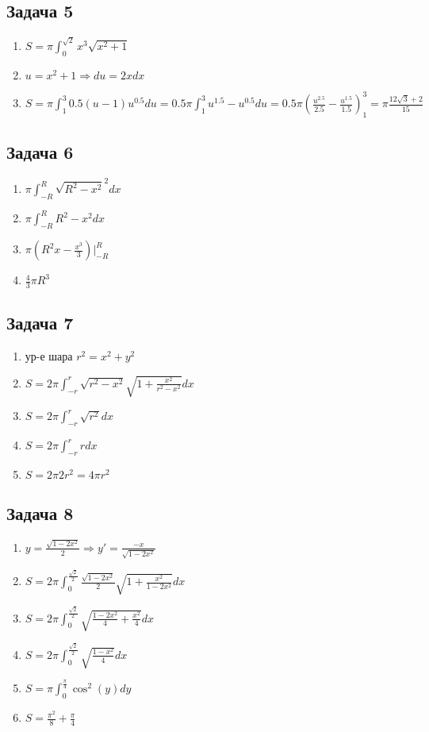 \documentclass[a4paper,12pt]{article}
\begin{document}
\subsection{Задача 5}
\begin{enumerate}
    \item $S = \pi \int_{0}^{\sqrt{2}} x^3\sqrt{x^2+1}$
    \item $u = x^2+1 \Rightarrow du = 2x dx$
    \item $S = \pi \int_{1}^{3} 0.5(u-1)u^{0.5}du = 0.5\pi \int_{1}^{3} u^{1.5}-u^{0.5} du = 0.5\pi (\frac{u^{2.5}}{2.5}-\frac{u^{1.5}}{1.5})_{1}^{3} = \pi \frac{12\sqrt{3}+2}{15}$
\end{enumerate}

\subsection{Задача 6}
\begin{enumerate}
    \item $\pi \int_{-R}^{R} \sqrt{R^2-x^2}^2dx$
    \item $\pi \int_{-R}^{R} R^2-x^2dx$
    \item $\pi (R^2x-\frac{x^3}{3})|_{-R}^R$
    \item $\frac{4}{3}\pi R^3$
\end{enumerate}

\subsection{Задача 7}
\begin{enumerate}
    \item ур-е шара $r^2=x^2+y^2$
    \item $S = 2\pi \int_{-r}^{r}\sqrt{r^2-x^2}\sqrt{1+\frac{x^2}{r^2-x^2}}dx$
    \item $S = 2\pi \int_{-r}^{r} \sqrt{r^2}dx$
    \item $S = 2\pi \int_{-r}^{r} rdx$
    \item $S = 2\pi 2r^2=4\pi r^2$
\end{enumerate}

\subsection{Задача 8}
\begin{enumerate}
    \item $y=\frac{\sqrt{1-2x^2}}{2} \Rightarrow y'=\frac{-x}{\sqrt{1-2x^2}}$
    \item $S = 2\pi \int_{0}^{\frac{\sqrt{2}}{2}}\frac{\sqrt{1-2x^2}}{2} \sqrt{1+\frac{x^2}{1-2x^2}}dx$
    \item $S = 2\pi \int_{0}^{\frac{\sqrt{2}}{2}}\sqrt{\frac{1-2x^2}{4}+\frac{x^2}{4}}dx$
    \item $S = 2\pi \int_{0}^{\frac{\sqrt{2}}{2}} \sqrt{\frac{1-x^2}{4}}dx$
    \item $S = \pi \int_{0}^{\frac{\pi}{4}} \cos^2(y)dy$
    \item $S = \frac{\pi^2}{8}+\frac{\pi}{4}$
\end{enumerate}
\end{document}
